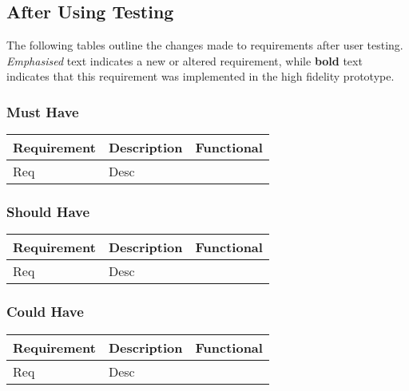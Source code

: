 \documentclass[requirements.tex]{subfiles}
\begin{document}
\newpage
\subsection{After Using Testing} %
The following tables outline the changes made to requirements after user
testing. \emph{Emphasised} text indicates a new or altered requirement, while
\textbf{bold} text indicates that this requirement was implemented in the high
fidelity prototype.

\subsubsection{Must Have} %
\label{ssub:after_must_have}
\begin{table}[H]
\small
\begin{tabularx}{\textwidth}{| l | X | l |}
 \hline
 \textbf{Requirement} & \textbf{Description} & \textbf{Functional} \\
 \hline
 Req & Desc & \\
 \hline
\end{tabularx}
\end{table}

\subsubsection{Should Have} %
\label{ssub:after_should_have}
\begin{table}[H]
\small
\begin{tabularx}{\textwidth}{| l | X | l |}
 \hline
 \textbf{Requirement} & \textbf{Description} & \textbf{Functional} \\
 \hline
 Req & Desc & \\
 \hline
\end{tabularx}
\end{table}

\subsubsection{Could Have} %
\label{ssub:after_could_have}
\begin{table}[H]
\small
\begin{tabularx}{\textwidth}{| l | X | l |}
 \hline
 \textbf{Requirement} & \textbf{Description} & \textbf{Functional} \\
 \hline
 Req & Desc & \\
 \hline
\end{tabularx}
\end{table}
\end{document}
